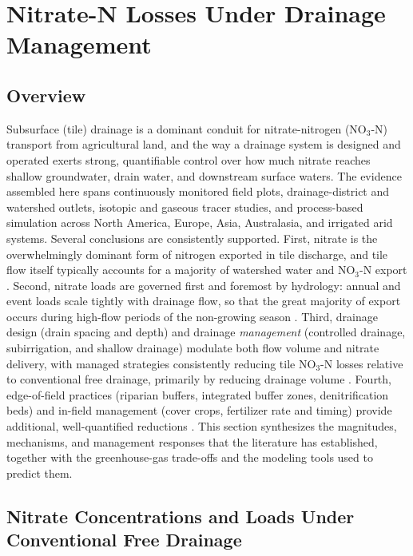 \documentclass[11pt]{article}
\begin{document}
\section*{Nitrate-N Losses Under Drainage Management}

\subsection{Overview}

Subsurface (tile) drainage is a dominant conduit for nitrate-nitrogen (NO$_3$-N) transport from agricultural land, and the way a drainage system is designed and operated exerts strong, quantifiable control over how much nitrate reaches shallow groundwater, drain water, and downstream surface waters. The evidence assembled here spans continuously monitored field plots, drainage-district and watershed outlets, isotopic and gaseous tracer studies, and process-based simulation across North America, Europe, Asia, Australasia, and irrigated arid systems. Several conclusions are consistently supported. First, nitrate is the overwhelmingly dominant form of nitrogen exported in tile discharge, and tile flow itself typically accounts for a majority of watershed water and NO$_3$-N export \parencite{Williams2015,Grose2022,Hayashi1999}. Second, nitrate loads are governed first and foremost by hydrology: annual and event loads scale tightly with drainage flow, so that the great majority of export occurs during high-flow periods of the non-growing season \parencite{Kladivko2021,ROSSI1991,Bauwe2020,Ikenberry2014,Speir2021}. Third, drainage design (drain spacing and depth) and drainage \emph{management} (controlled drainage, subirrigation, and shallow drainage) modulate both flow volume and nitrate delivery, with managed strategies consistently reducing tile NO$_3$-N losses relative to conventional free drainage, primarily by reducing drainage volume \parencite{Cooke2012,Nash2015d,Elmi2004,Smith2019,Ross2016}. Fourth, edge-of-field practices (riparian buffers, integrated buffer zones, denitrification beds) and in-field management (cover crops, fertilizer rate and timing) provide additional, well-quantified reductions \parencite{Jaynes2014,Carstensen2021,Kaspar2007,Chaplot2004}. This section synthesizes the magnitudes, mechanisms, and management responses that the literature has established, together with the greenhouse-gas trade-offs and the modeling tools used to predict them.

\subsection{Nitrate Concentrations and Loads Under Conventional Free Drainage}
\end{document}
